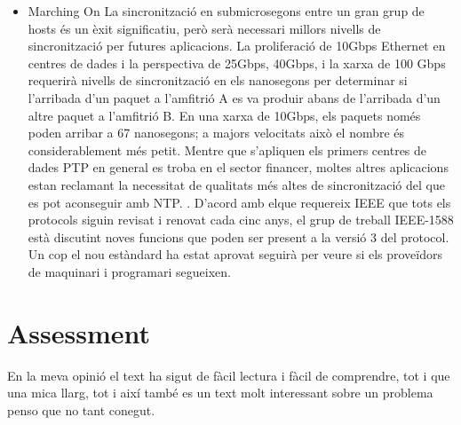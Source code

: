 \documentclass[a4paper, 10pt]{article}
\begin{document}
\begin{itemize}
    \item Marching On \newline
    La sincronització en submicrosegons entre un gran grup de hosts és un èxit significatiu, però serà necessari millors nivells de sincronització per futures aplicacions. La proliferació de 10Gbps Ethernet en centres de dades
    i la perspectiva de 25Gbps, 40Gbps, i la xarxa de 100 Gbps requerirà nivells de sincronització en els nanosegons per determinar si l'arribada d'un paquet a l'amfitrió A es va produir abans de l'arribada d'un altre paquet a l'amfitrió B. En una xarxa de 10Gbps, els paquets només poden arribar a 67 nanosegons; a majors velocitats això el nombre és considerablement més petit. Mentre que s'apliquen els primers centres de dades PTP en general es troba en el sector financer, moltes altres aplicacions estan reclamant la necessitat de qualitats més altes de sincronització del que es pot aconseguir amb NTP. . D'acord amb elque requereix IEEE que tots els protocols siguin revisat i renovat cada cinc anys, el grup de treball IEEE-1588 està discutint noves funcions que poden ser present a la versió 3 del protocol. Un cop el nou estàndard ha estat aprovat seguirà per veure si els proveïdors de maquinari i programari segueixen.
    
\end{itemize}

\section{Assessment}

En la meva opinió el text ha sigut de fàcil lectura i fàcil de comprendre, tot i que una mica llarg, tot i així també es un text molt interessant sobre un problema penso que no tant conegut.
\end{document}
